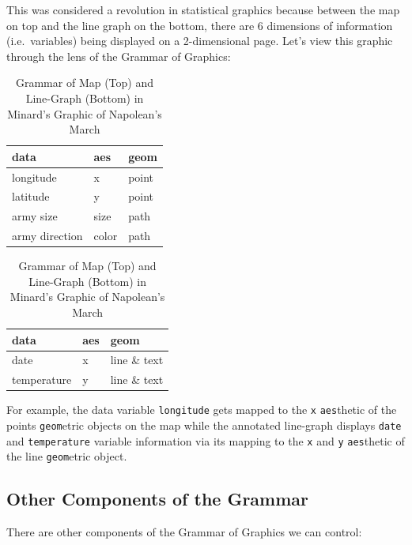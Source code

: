 \documentclass[]{tufte-book}
\theoremstyle{definition}
\theoremstyle{definition}
\theoremstyle{remark}
\begin{document}
This was considered a revolution in statistical graphics because between
the map on top and the line graph on the bottom, there are 6 dimensions
of information (i.e.~variables) being displayed on a 2-dimensional page.
Let's view this graphic through the lens of the Grammar of Graphics:

\begin{table}
\caption{\label{tab:unnamed-chunk-17}Grammar of Map (Top) and Line-Graph (Bottom) in Minard's Graphic of Napolean's March}

\centering
\begin{tabular}[t]{lll}
\toprule
data & aes & geom\\
\midrule
longitude & x & point\\
latitude & y & point\\
army size & size & path\\
army direction & color & path\\
\bottomrule
\end{tabular}
\centering
\begin{tabular}[t]{lll}
\toprule
data & aes & geom\\
\midrule
date & x & line \& text\\
temperature & y & line \& text\\
\bottomrule
\end{tabular}
\end{table}

For example, the data variable \texttt{longitude} gets mapped to the
\texttt{x} \texttt{aes}thetic of the points \texttt{geom}etric objects
on the map while the annotated line-graph displays \texttt{date} and
\texttt{temperature} variable information via its mapping to the
\texttt{x} and \texttt{y} \texttt{aes}thetic of the line
\texttt{geom}etric object.

\subsection{Other Components of the
Grammar}\label{other-components-of-the-grammar}

There are other components of the Grammar of Graphics we can control:
\end{document}
